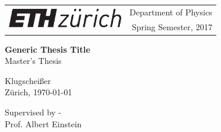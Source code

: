 \begin{titlepage}

\begin{tabular}{l r}
\multirow{2}{10cm}{\includegraphics[width=5cm]{logo_eth.png}}
& \large \textsf{Department of Physics} \\
& \large \textsf{Spring Semester, 2017}
\end{tabular}

\vfill


\begin{center}
\Huge \textbf{Generic Thesis Title} \\
\vspace{0.3cm}
\large Master's Thesis\\
\vspace{12em}
\end{center}

\begin{center}
\large {Klugscheißer}\\
\large {Z\"urich, \today}

\vspace{6em}
\large Supervised by - \\
\large {Prof. Albert Einstein}\\
\end{center}

\end{titlepage}
